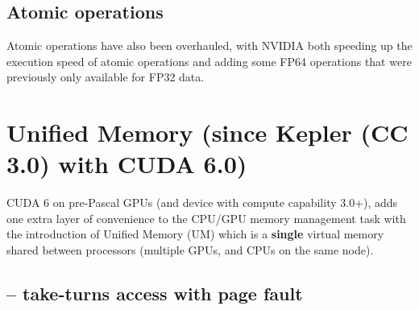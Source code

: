 \subsection{Atomic operations}

Atomic operations have also been overhauled, with NVIDIA both speeding up the
execution speed of atomic operations and adding some FP64 operations that were
previously only available for FP32 data.


\section{Unified Memory (since Kepler (CC 3.0) with CUDA 6.0)}
\label{sec:Unified-Memory-CUDA6.0}

CUDA 6 on pre-Pascal GPUs (and device with compute capability 3.0+), adds one
extra layer of convenience to the CPU/GPU memory management task with the
introduction of Unified Memory (UM) which is a {\bf single} virtual memory
shared between processors (multiple GPUs, and CPUs on the same node).

\subsection{-- take-turns access with page fault}


